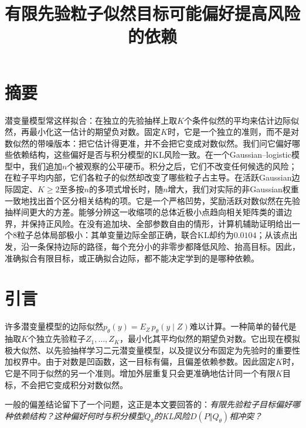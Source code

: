 \documentclass[11pt,a4paper]{article}
\title{有限先验粒子似然目标可能偏好提高风险的依赖}
\author{}
\date{}
\begin{document}
\maketitle
\begingroup\let\thefootnote\relax{}\endgroup
\section*{摘要}
潜变量模型常这样拟合：在独立的先验抽样上取\(K\)个条件似然的平均来估计边际似然，再最小化这一估计的期望负对数。固定\(K\)时，它是一个独立的准则，而不是对数似然的带噪版本：把它估计得更准，并不会把它变成对数似然。我们问它偏好哪些依赖结构，这些偏好是否与积分模型的KL风险一致。在一个Gaussian--logistic模型中，我们追加\(n\)个被观察的公平硬币。积分之后，它们不改变任何候选的风险；在粒子平均内部，它们各粒子的似然却改变了哪些粒子占主导。在活跃Gaussian边际固定、\(K\ge2\)至多按\(n\)的多项式增长时，随\(n\)增大，我们对实际的非Gaussian权重一致地找出首个区分相关结构的项。它是一个严格凹势，奖励活跃对数似然在先验抽样间更大的方差。能够分辨这一收缩项的总体近极小点趋向相关矩阵类的谱边界，并保持正风险。在没有追加块、全部参数自由的情形，计算机辅助证明给出一个8粒子总体局部极小：其单变量边际全部正确，联合KL却约为\(0.0104\)；从该点出发，沿一条保持边际的路径，每个充分小的非零步都降低风险、抬高目标。因此，准确拟合有限目标，或正确拟合边际，都不能决定学到的是哪种依赖。
\section{引言}\label{ux5f15ux8a00}

许多潜变量模型的边际似然\(p_\theta(y)=E_{Z}\,p_\theta(y\mid Z)\)难以计算。一种简单的替代是抽取\(K\)个独立先验粒子\(Z_1,\ldots,Z_K\)，最小化其平均似然的期望负对数。它出现在模拟极大似然\citep{lee1995}、以先验抽样学习二元潜变量模型\citep{tipping1998}，以及提议分布固定为先验时的重要性加权界\citep{burda2016}中。由于对数是凹函数，这一目标有偏，且偏差依赖参数\citep{maddison2017, sung2007}。因此固定\(K\)时，它是不同于似然的另一个准则。增加外层重复只会更准确地估计同一个有限\(K\)目标，不会把它变成积分对数似然。

一般的偏差结论留下了一个问题，这正是本文要回答的：\emph{有限先验粒子目标偏好哪种依赖结构？这种偏好何时与积分模型\(Q_\theta\)的KL风险\(D(P\Vert Q_\theta)\)相冲突？}
\end{document}
